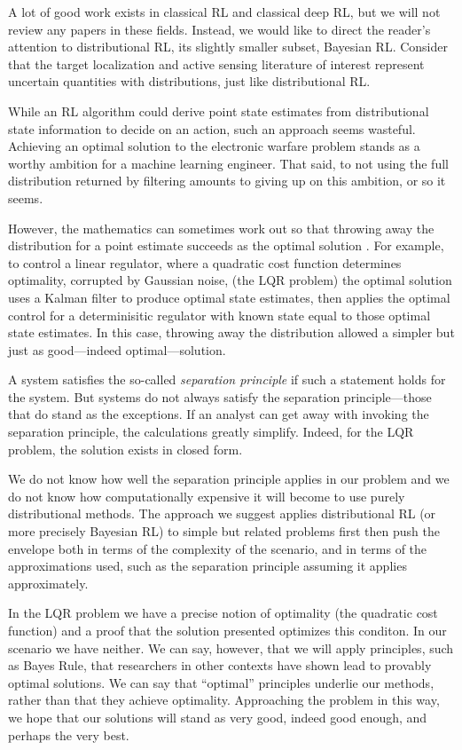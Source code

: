 \documentclass{article}
\begin{document}
A lot of good work exists in classical RL and classical deep RL, but
we will not review any papers in these fields.  Instead, we would like
to direct the reader's attention to distributional RL, its slightly
smaller subset, Bayesian RL.  Consider that the target localization and
active sensing literature of interest represent uncertain quantities
with distributions, just like distributional RL.

While an RL algorithm could derive point state estimates from
distributional state information to decide on an action, such an
approach seems wasteful.  Achieving an optimal solution to the
electronic warfare problem stands as a worthy ambition for a machine
learning engineer.  That said, to not using the full distribution
returned by filtering amounts to giving up on this ambition, or so it seems.

However, the mathematics can sometimes work out so that throwing away
the distribution for a point estimate succeeds as the optimal solution
\cite{aastrom2012introduction}.  For example, to control a linear
regulator, where a quadratic cost function determines optimality,
corrupted by Gaussian noise, (the LQR problem) the optimal solution
uses a Kalman filter to produce optimal state estimates, then applies
the optimal control for a determinisitic regulator with known state
equal to those optimal state estimates.  In this case, throwing away
the distribution allowed a simpler but just as good---indeed
optimal---solution.

A system satisfies the so-called \emph{separation principle} if such a
statement holds for the system.  But systems do not always satisfy the
separation principle---those that do stand as the exceptions.  If an
analyst can get away with invoking the separation principle, the
calculations greatly simplify.  Indeed, for the LQR problem, the
solution exists in closed form.

We do not know how well the separation principle applies in our
problem and we do not know how computationally expensive it will
become to use purely distributional methods.  The approach we suggest
applies distributional RL (or more precisely Bayesian RL) to simple
but related problems first then push the envelope both in terms of the
complexity of the scenario, and in terms of the approximations used,
such as the separation principle assuming it applies approximately.

In the LQR problem we have a precise notion of optimality (the
quadratic cost function) and a proof that the solution presented
optimizes this conditon.  In our scenario we have neither.  We can
say, however, that we will apply principles, such as Bayes Rule, that
researchers in other contexts have shown lead to provably optimal
solutions.  We can say that ``optimal'' principles underlie our
methods, rather than that they achieve optimality.  Approaching the
problem in this way, we hope that our solutions will stand as very
good, indeed good enough, and perhaps the very best.
\end{document}
